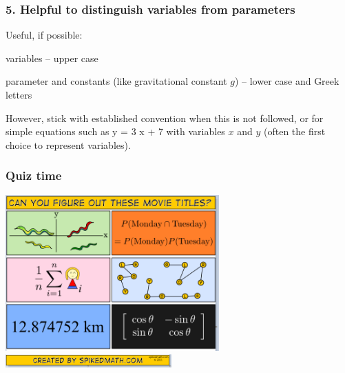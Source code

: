 
\begin{frame}
\frametitle{5. Helpful to distinguish variables from parameters}

Useful, if possible:
\bi
 \item variables -- upper case
 \item parameter and constants (like gravitational constant $g$) -- lower case
   and Greek letters
\ei

However, stick with established convention when this is not followed, or for
simple equations such as
\eb
\nonumber y = 3 x + 7
\ee
with variables $x$ and $y$ (often the first choice to represent variables).

\end{frame}


\begin{frame}
\frametitle{Quiz time}

\centering
\includegraphics[height=6cm]{images/movies2.png}\\
\includegraphics[height=0.5cm]{images/movies-credit.png}

\end{frame}


